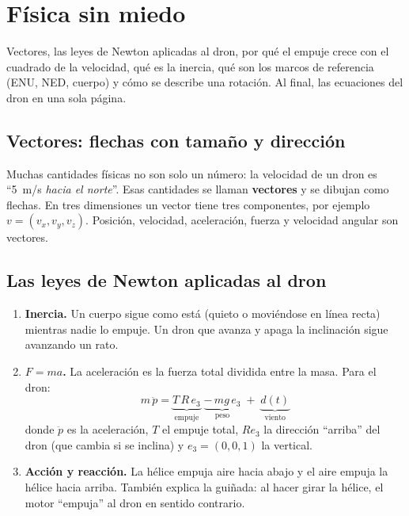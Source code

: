 \chapter{Física sin miedo}

\begin{enpocas}
Vectores, las leyes de Newton aplicadas al dron, por qué el empuje crece con el cuadrado de la
velocidad, qué es la inercia, qué son los marcos de referencia (ENU, NED, cuerpo) y cómo se describe
una rotación. Al final, las ecuaciones del dron en una sola página.
\end{enpocas}

\section{Vectores: flechas con tamaño y dirección}

Muchas cantidades físicas no son solo un número: la velocidad de un dron es ``5~m/s \emph{hacia el
norte}''. Esas cantidades se llaman \textbf{vectores} y se dibujan como flechas. En tres
dimensiones un vector tiene tres componentes, por ejemplo $v = (v_x, v_y, v_z)$. Posición,
velocidad, aceleración, fuerza y velocidad angular son vectores.

\section{Las leyes de Newton aplicadas al dron}

\begin{enumerate}
  \item \textbf{Inercia.} Un cuerpo sigue como está (quieto o moviéndose en línea recta) mientras
        nadie lo empuje. Un dron que avanza y apaga la inclinación sigue avanzando un rato.
  \item \textbf{$F = ma$.} La aceleración es la fuerza total dividida entre la masa. Para el dron:
        \begin{equation}
        m\,\ddot p = \underbrace{T\,R\,e_3}_{\text{empuje}} \;\underbrace{-\,mg\,e_3}_{\text{peso}} \;+\; \underbrace{d(t)}_{\text{viento}}
        \end{equation}
        donde $\ddot p$ es la aceleración, $T$ el empuje total, $R e_3$ la dirección ``arriba'' del
        dron (que cambia si se inclina) y $e_3 = (0,0,1)$ la vertical.
  \item \textbf{Acción y reacción.} La hélice empuja aire hacia abajo y el aire empuja la hélice
        hacia arriba. También explica la guiñada: al hacer girar la hélice, el motor ``empuja'' al
        dron en sentido contrario.
\end{enumerate}


